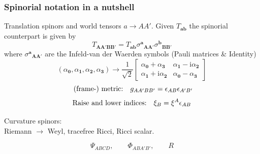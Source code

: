 \documentclass[10pt]{beamer}
\theoremstyle{plain}
\def\bma{{\bm a}}
\def\bmb{{\bm b}}
\def\bmA{{\bm A}}
\def\bmB{{\bm B}}
\begin{document}
\begin{frame}
\frametitle{Spinorial notation in a nutshell}
Translation spinors and world tensors $a\rightarrow AA'$.
Given $T_{\bma\bmb}$ the spinorial counterpart is given by
\begin{equation*}
T_{\bmA\bmA'\bmB\bmB'}=T_{\bma\bmb}\sigma^{\bma}{}_{\bmA\bmA'}\sigma^{\bmb}{}_{\bmB\bmB'}
\end{equation*} 
where $\sigma^{\bma}{}_{\bmA\bmA'}$ are the Infeld-van der Waerden symbols (Pauli matrices \& Identity) 
\begin{equation*}
(\alpha_{\bm0},\alpha_{\bm1},\alpha_{\bm2},\alpha_{\bm3})\rightarrow
\frac{1}{\sqrt{2}}
  \begin{bmatrix}
    \alpha_{\bm0}+ \alpha_{\bm3} & \alpha_{\bm1}-\mbox{i}\alpha_{\bm2} \\
    \alpha_{\bm1}+\mbox{i}\alpha_{\bm2} &  \alpha_{\bm0}-\alpha_{\bm3}
  \end{bmatrix}
\end{equation*}
\pause
\vspace{2mm}
\[
\text{ \textcolor{black}{(frame-) metric:}}\quad g_{AA'BB'}=\epsilon_{AB}\epsilon_{A'B'}
\]
\[
\text{\textcolor{black}{Raise and lower indices:}}\quad \xi_{B}=\xi^A\epsilon_{AB}
\]
\begin{center}
Curvature spinors:\\
Riemann $\rightarrow$ Weyl, \;\;\;tracefree Ricci, \;\;\; Ricci scalar.
\end{center}
\[
\Psi_{ABCD}, \qquad \Phi_{ABA'B'}, \qquad R
\]
\end{frame}
\end{document}
